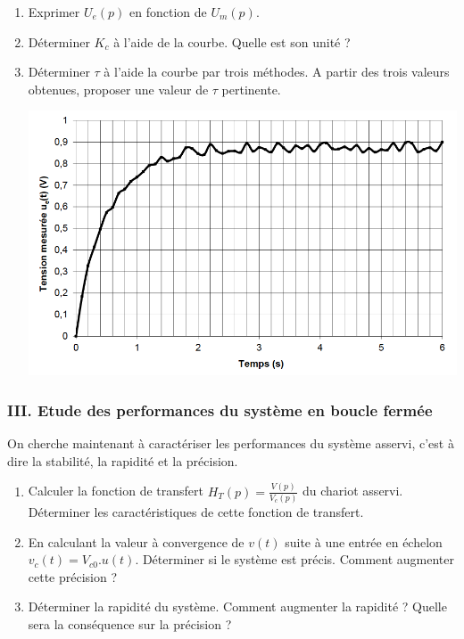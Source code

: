 \begin{enumerate}
\item Exprimer $U_e(p)$ en fonction de $U_m(p)$.
\item D\'eterminer $K_c$ \`a l'aide de la courbe. Quelle est son unit\'e ?
\item D\'eterminer $\tau$ \`a l'aide la courbe par trois m\'ethodes. A partir des trois valeurs obtenues,
proposer une valeur de $\tau$ pertinente.\\
\hspace*{0mm}
\begin{center} \includegraphics[scale=0.45]{png/courbe_prob2.png}\end{center}
\hspace*{0mm}
\end{enumerate}
\newpage

\subsubsection{III. Etude des performances du syst\`eme en boucle ferm\'ee}
On cherche maintenant \`a caract\'eriser les performances du syst\`eme asservi, c'est \`a dire la stabilit\'e, la rapidit\'e et la pr\'ecision.

\begin{enumerate}
\item Calculer la fonction de transfert \(H_T(p) = \frac{V(p)}{V_c(p)}\) du chariot asservi. D\'eterminer les caract\'eristiques de cette fonction de transfert.

\item En calculant la valeur \`a convergence de $v(t)$ suite \`a une entr\'ee en \'echelon $v_c(t)=V_{c0}.u(t)$. D\'eterminer si le syst\`eme est pr\'ecis. Comment augmenter cette pr\'ecision ?

\item D\'eterminer la rapidit\'e du syst\`eme. Comment augmenter la rapidit\'e ? Quelle sera la cons\'equence sur la pr\'ecision ?
\end{enumerate}

